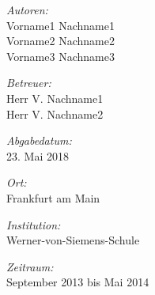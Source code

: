 \begin{titlepage}
\begin{center}
\begin{minipage}{0.4\textwidth}
\begin{flushleft} \large
\emph{Autoren:}\\
Vorname1 Nachname1\\Vorname2 Nachname2\\Vorname3 Nachname3
\end{flushleft}
\end{minipage}
\par\bigskip
\par\bigskip
\begin{minipage}{0.4\textwidth}
\begin{flushleft} \large
\emph{Betreuer:}\\
Herr V. Nachname1\\Herr V. Nachname2
\end{flushleft}
\end{minipage}
\par\bigskip
\par\bigskip
\begin{minipage}{0.4\textwidth}
\begin{flushleft} \large
\emph{Abgabedatum:}\\
23. Mai 2018
\end{flushleft}
\end{minipage}
\par\bigskip
\par\bigskip
\begin{minipage}{0.4\textwidth}
\begin{flushleft} \large
\emph{Ort:}\\
Frankfurt am Main
\end{flushleft}
\end{minipage}
\par\bigskip
\par\bigskip
\begin{minipage}{0.4\textwidth}
\begin{flushleft} \large
\emph{Institution:}\\
Werner-von-Siemens-Schule
\end{flushleft}
\end{minipage}
\par\bigskip
\par\bigskip
\begin{minipage}{0.4\textwidth}
\begin{flushleft} \large
\emph{Zeitraum:}\\
September 2013 bis Mai 2014
\end{flushleft}
\end{minipage}
\end{center}

\end{titlepage}
